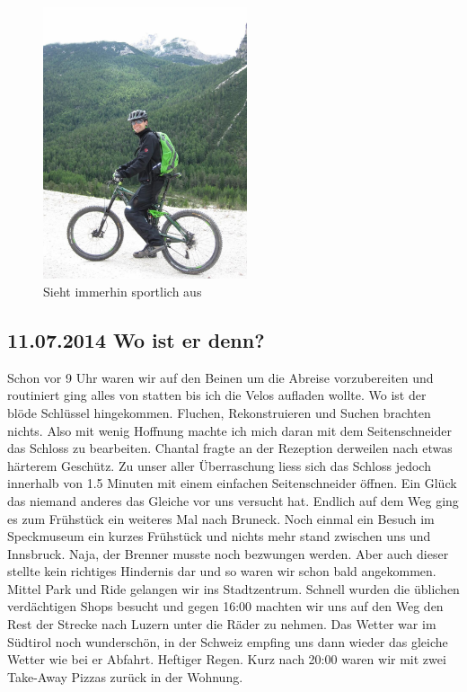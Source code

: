 \begin{figure}[H]
    \centering
    \includegraphics[width=\textwidth,height=8cm, keepaspectratio]{../Bilder/Dolomiten/35.jpg}
    \caption{Sieht immerhin sportlich aus}
    \label{img:Velo}
\end{figure}

\subsection{11.07.2014 Wo ist er denn?}
Schon vor 9 Uhr waren wir auf den Beinen um die Abreise vorzubereiten und routiniert ging alles von statten bis ich die Velos aufladen wollte.
Wo ist der blöde Schlüssel hingekommen.
Fluchen, Rekonstruieren und Suchen brachten nichts.
Also mit wenig Hoffnung machte ich mich daran mit dem Seitenschneider das Schloss zu bearbeiten.
Chantal fragte an der Rezeption derweilen nach etwas härterem Geschütz.
Zu unser aller Überraschung liess sich das Schloss jedoch innerhalb von 1.5 Minuten mit einem einfachen Seitenschneider öffnen.
Ein Glück das niemand anderes das Gleiche vor uns versucht hat.
Endlich auf dem Weg ging es zum Frühstück ein weiteres Mal nach Bruneck.
Noch einmal ein Besuch im Speckmuseum ein kurzes Frühstück und nichts mehr stand zwischen uns und Innsbruck.
Naja, der Brenner musste noch bezwungen werden.
Aber auch dieser stellte kein richtiges Hindernis dar und so waren wir schon bald angekommen.
Mittel Park und Ride gelangen wir ins Stadtzentrum.
Schnell wurden die üblichen verdächtigen Shops besucht und gegen 16:00 machten wir uns auf den Weg den Rest der Strecke nach Luzern unter die Räder zu nehmen.
Das Wetter war im Südtirol noch wunderschön, in der Schweiz empfing uns dann wieder das gleiche Wetter wie bei er Abfahrt.
Heftiger Regen.
Kurz nach 20:00 waren wir mit zwei Take-Away Pizzas zurück in der Wohnung. 

